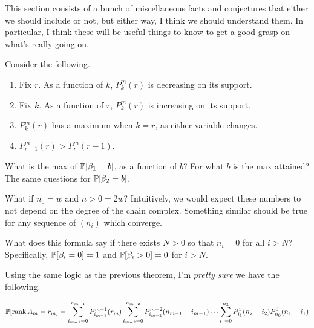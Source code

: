 
This section consists of a bunch of miscellaneous facts and conjectures that
either we should include or not, but either way, I think we should understand
them. In particular, I think these will be useful things to know to get a good
grasp on what's really going on. 

\begin{conjecture}
 Consider the following.
  \begin{enumerate}
    \item Fix $r$. As a function of $k$, $P^m_k(r)$ is decreasing on its support.
    \item Fix $k$. As a function of $r$, $P^m_k(r)$ is increasing on its support.
    \item $P^m_k(r)$ has a maximum when $k = r$, as either variable changes.
    \item $P^m_{r+1}(r) > P^m_r(r-1)$.
  \end{enumerate}
\end{conjecture}

\begin{question} 
  What is the max of $\mathbb{P}[\beta_1=b]$, as a function of $b$? For
  what $b$ is the max attained? The same questions for $\mathbb{P}[\beta_2=b]$.
\end{question}

\begin{question}
  What if $n_0 = w$ and $n>0 = 2w$? Intuitively, we would expect these numbers
  to not depend on the degree of the chain complex. Something similar should
  be true for any sequence of $(n_i)$ which converge.
\end{question}

\begin{question}
  What does this formula say if there exists $N >0$ so that $n_i=0$ for 
  all $i > N$? Specifically, $\mathbb{P}[\beta_i=0] = 1$ and $\mathbb{P}[\beta_i > 0]= 0$ 
  for $i>N$.
\end{question}

Using the same logic as the previous theorem, I'm {\em pretty sure} we have
the following.

\begin{conjecture}
  \[
    \mathbb{P}[\operatorname{\mathrm{rank}} A_m = r_m] = \sum_{i_{m-1}=0}^{n_{m-1}} P^{m-1}_{i_{m-1}}(r_m)
    \sum_{i_{m-2} = 0}^{n_{m-2}} P^{m-2}_{i_{m-2}}(n_{m-1}- i_{m-1})
    \cdots \sum_{i_1 = 0}^{n_2}P^1_{i_1}(n_2-i_2) P^0_{n_0}(n_1-i_1)
  \]
\end{conjecture}


